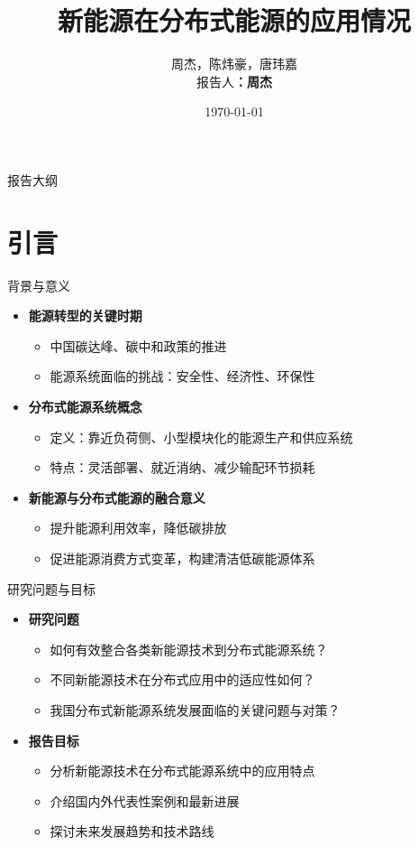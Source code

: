 \documentclass[aspectratio=169]{beamer}
\title{新能源在分布式能源的应用情况}
\author{周杰，陈炜豪，唐玮嘉 \\报告人\textbf{：周杰}}
\institute{东莞理工学院}
\date{\today}
\begin{document}
\begin{frame}
  \titlepage
\end{frame}

\begin{frame}{报告大纲}
  \tableofcontents
\end{frame}

\section{引言}

\begin{frame}{背景与意义}
  \begin{itemize}
    \item \textbf{能源转型的关键时期}
      \begin{itemize}
        \item 中国碳达峰、碳中和政策的推进\cite{Zhou2022}
        \item 能源系统面临的挑战：安全性、经济性、环保性
      \end{itemize}
    \item \textbf{分布式能源系统概念}
      \begin{itemize}
        \item 定义：靠近负荷侧、小型模块化的能源生产和供应系统
        \item 特点：灵活部署、就近消纳、减少输配环节损耗
      \end{itemize}
    \item \textbf{新能源与分布式能源的融合意义}
      \begin{itemize}
        \item 提升能源利用效率，降低碳排放
        \item 促进能源消费方式变革，构建清洁低碳能源体系\cite{Li2021}
      \end{itemize}
  \end{itemize}
\end{frame}

\begin{frame}{研究问题与目标}
  \begin{itemize}
    \item \textbf{研究问题}
      \begin{itemize}
        \item 如何有效整合各类新能源技术到分布式能源系统？
        \item 不同新能源技术在分布式应用中的适应性如何？
        \item 我国分布式新能源系统发展面临的关键问题与对策？
      \end{itemize}
    \item \textbf{报告目标}
      \begin{itemize}
        \item 分析新能源技术在分布式能源系统中的应用特点
        \item 介绍国内外代表性案例和最新进展
        \item 探讨未来发展趋势和技术路线\cite{Wang2023}
      \end{itemize}
  \end{itemize}
\end{frame}
\end{document}
